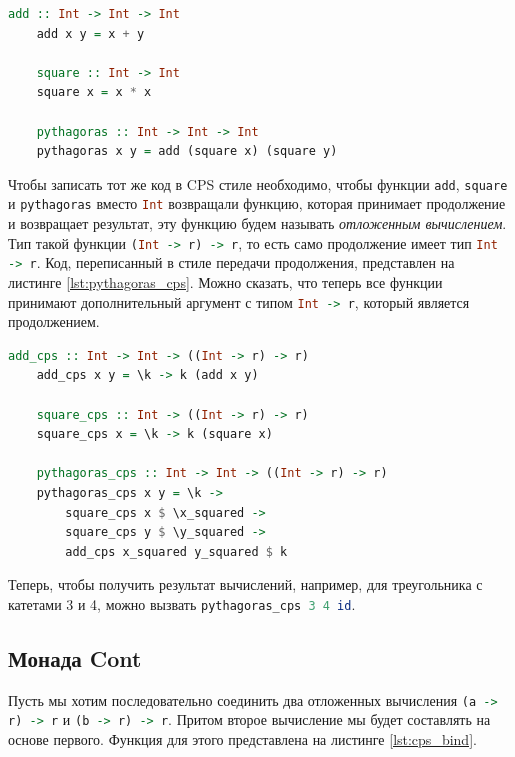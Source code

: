 \documentclass[times]{itmo-student-thesis}
\begin{document}
\begin{lstlisting}[language=Haskell,float=!h,caption={Теорема Пифагора},label={lst:pythagoras}]
    add :: Int -> Int -> Int
    add x y = x + y

    square :: Int -> Int
    square x = x * x

    pythagoras :: Int -> Int -> Int
    pythagoras x y = add (square x) (square y)
\end{lstlisting}

Чтобы записать тот же код в CPS стиле необходимо, чтобы функции \lstinline[language=Haskell]{add}, 
\lstinline[language=Haskell]{square} и \lstinline[language=Haskell]{pythagoras} вместо \lstinline[language=Haskell]{Int}
возвращали функцию, которая принимает продолжение и возвращает результат, эту функцию будем называть \textit{отложенным вычислением}. Тип такой функции \lstinline[language=Haskell]{(Int -> r) -> r}, 
то есть само продолжение имеет тип \lstinline[language=Haskell]{Int -> r}. Код, переписанный в стиле передачи продолжения, 
представлен на листинге \ref{lst:pythagoras_cps}. Можно сказать, что теперь все функции принимают дополнительный аргумент 
с типом \lstinline[language=Haskell]{Int -> r}, который является продолжением.

\begin{lstlisting}[language=Haskell,float=!h,caption={Теорема Пифагора в CPS},label={lst:pythagoras_cps}]
    add_cps :: Int -> Int -> ((Int -> r) -> r)
    add_cps x y = \k -> k (add x y)
    
    square_cps :: Int -> ((Int -> r) -> r)
    square_cps x = \k -> k (square x)
    
    pythagoras_cps :: Int -> Int -> ((Int -> r) -> r)
    pythagoras_cps x y = \k ->
        square_cps x $ \x_squared ->
        square_cps y $ \y_squared ->
        add_cps x_squared y_squared $ k
\end{lstlisting}

Теперь, чтобы получить результат вычислений, например, для треугольника с катетами 3 и 4, можно вызвать \lstinline[language=Haskell]{pythagoras_cps 3 4 id}.

\subsection{Монада Cont}\label{sec:cps_monad}

Пусть мы хотим последовательно соединить два
отложенных вычисления \lstinline[language=Haskell]{(a -> r) -> r} и \lstinline[language=Haskell]{(b -> r) -> r}. 
Притом второе вычисление мы будет составлять на основе первого. Функция для этого представлена на листинге \ref{lst:cps_bind}.
\end{document}
